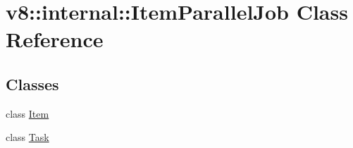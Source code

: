 \hypertarget{classv8_1_1internal_1_1ItemParallelJob}{}\section{v8\+:\+:internal\+:\+:Item\+Parallel\+Job Class Reference}
\label{classv8_1_1internal_1_1ItemParallelJob}
\subsection*{Classes}
\begin{DoxyCompactItemize}
\item 
class \mbox{\hyperlink{classv8_1_1internal_1_1ItemParallelJob_1_1Item}{Item}}
\item 
class \mbox{\hyperlink{classv8_1_1internal_1_1ItemParallelJob_1_1Task}{Task}}
\end{DoxyCompactItemize}
